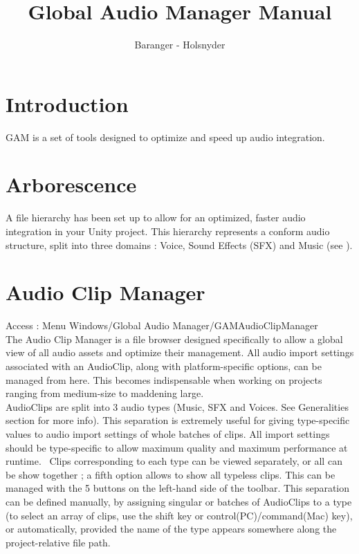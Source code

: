 \documentclass[a4paper,10pt]{article}
\begin{document}
\title{Global Audio Manager Manual}
\author{Baranger - Holsnyder}
\maketitle

\clearpage


\tableofcontents %

\clearpage



\section*{Introduction}

GAM is a set of tools designed to optimize and speed up audio integration.

\section{Arborescence}

A file hierarchy has been set up to allow for an optimized, faster audio integration in your Unity project. This hierarchy represents a conform audio structure, split into three domains : Voice, Sound Effects (SFX) and Music (see ).


\section{Audio Clip Manager}

Access : Menu Windows/Global Audio Manager/GAMAudioClipManager
\\

The Audio Clip Manager is a file browser designed specifically to allow a global view of all audio assets and optimize their management. All audio import settings associated with an AudioClip, along with platform-specific options, can be managed from here. This becomes indispensable when working on projects ranging from medium-size to maddening large. \\

AudioClips are split into 3 audio types (Music, SFX and Voices. See Generalities section for more info). This separation is extremely useful for giving type-specific values to audio import settings of whole batches of clips. All import settings should be type-specific to allow maximum quality and maximum performance at runtime. \
Clips corresponding to each type can be viewed separately, or all can be show together ; a fifth option allows to show all typeless clips.
This can be managed with the 5 buttons on the left-hand side of the toolbar. This separation can be defined manually, by assigning singular or batches of AudioClips to a type (to select an array of clips, use the shift key or control(PC)/command(Mac) key), or automatically, provided the name of the type appears somewhere along the project-relative file path.\\
\end{document}
